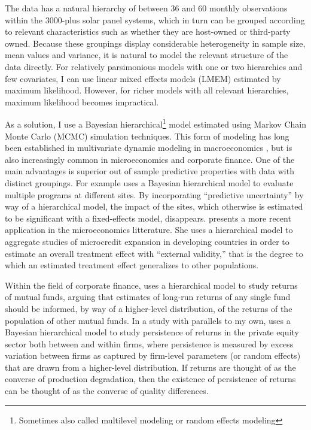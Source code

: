 \documentclass[a4paper]{article}
\begin{document}
The data has a natural hierarchy of between 36 and 60 monthly observations within the 3000-plus solar panel systems, which in turn can be grouped according to relevant characteristics such as whether they are host-owned or third-party owned. Because these groupings display considerable heterogeneity in sample size, mean values and variance, it is natural to model the relevant structure of the data directly. For relatively parsimonious models with one or two hierarchies and few covariates, I can use linear mixed effects models (LMEM) estimated by maximum likelihood. However, for richer models with all relevant hierarchies, maximum likelihood becomes impractical.

As a solution, I use a Bayesian hierarchical\footnote{Sometimes also called multilevel modeling or random effects modeling} model estimated using Markov Chain Monte Carlo (MCMC) simulation techniques. This form of modeling has long been established in multivariate dynamic modeling in macroeconomics \citep{doan_forecasting_1984, litterman_forecasting_1986,sims_bayesian_1998, canova_forecasting_2004},  but is also increasingly common in microeconomics and corporate finance. One of the main advantages is superior out of sample predictive properties with data with distinct groupings. For example \citet{dehejia_was_2003} uses a Bayesian hierarchical model to evaluate multiple programs at different sites. By incorporating ``predictive uncertainty'' by way of a hierarchical model, the impact of the sites, which otherwise is estimated to be significant with a fixed-effects model, disappears. \citet{meager_understanding_2018} presents a more recent application in the microeconomics litterature. She uses a hierarchical model to aggregate studies of microcredit expansion in developing countries in order to estimate an overall treatment effect with ``external validity,'' that is the degree to which an estimated treatment effect generalizes to other populations.

Within the field of corporate finance, \citet{jones_mutual_2005} uses a hierarchical model to study returns of mutual funds, arguing that estimates of long-run returns of any single fund should be informed, by way of a higher-level distribution, of the returns of the population of other mutual funds. In a study with parallels to my own, \citet{korteweg_skill_2017} uses a Bayesian hierarchical model to study persistence of returns in the private equity sector both between and within firms, where persistence is measured by excess variation between firms as captured by firm-level parameters (or random effects) that are drawn from a higher-level distribution. If returns are thought of as the converse of production degradation, then the existence of persistence of returns can be thought of as the converse of quality differences.
\end{document}
